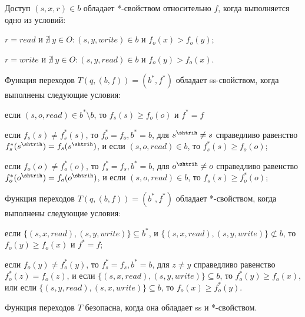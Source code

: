 \begin{defs}
	Доступ $(s,x,r) \in b$ обладает *-свойством относительно $f$, когда выполняется одно из условий:
	\begin{itemize*}
		\item $r = read$ и $\nexists \ y \in O: (s,y,write) \in b$ и $f_o(x) > f_o(y)$;
		\item $r = write$ и $\nexists \ y \in O: (s,y,read) \in b$ и $f_o(y) > f_o(x)$.
	\end{itemize*}
\end{defs}

\begin{defs}
	Функция переходов $T(q, (b,f)) = (b^*,f^*)$ обладает ss-свойством, когда выполнены следующие условия:
	\begin{itemize*}
		\item если $(s,o,read) \in b^* \setminus b$, то $f_s(s) \geqslant f_o(o)$ и $f^* = f$
		\item если $f_s(s) \neq f_s^*(s)$, то $f_o^* = f_o, b^* = b$, для $s^{\shtrih} \neq s$ справедливо равенство $f_s^*(s^{\shtrih}) = f_s(s^{\shtrih})$, и если $(s,o,read) \in b$, то $f_s^*(s) \geqslant f_o(o)$;
		\item если $f_o(o) \neq f_o^*(o)$, то $f_s^* = f_s, b^* = b$, для $o^{\shtrih} \neq o$ справедливо равенство $f_o^*(o^{\shtrih}) = f_o(o^{\shtrih})$, и если $(s,o,read) \in b$, то $f_s(s) \geqslant f_o^*(o)$;
	\end{itemize*}
\end{defs}

\begin{defs}
	Функция переходов $T(q, (b,f)) = (b^*,f^*)$ обладает *-свойством, когда выполнены следующие условия:
	\begin{itemize*}
		\item если $\{(s,x,read), (s,y,write)\} \subseteq b^*$, и $\{(s,x,read), (s,y,write)\} \not\subset b$, то $f_o(y) \geqslant f_o(x)$ и $f^* = f$;
		\item если $f_o(y) \neq f_o^*(y)$, то $f_s^* = f_s, b^* = b$, для $z \neq y$ справедливо равенство $f_o^*(z) = f_o(z)$, и если $\{(s,x,read),(s,y,write)\} \subseteq b$, то $f_o^*(y) \geqslant f_o(x)$, или
		если $\{(s,y,read), (s,x,write)\} \subseteq b$, то $f_o(x) \geqslant f_o^*(y)$.
	\end{itemize*}
\end{defs}

\begin{defs}[Безопасность Т]
	Функция переходов $T$ безопасна, когда она обладает ss и *-свойством.
\end{defs}

